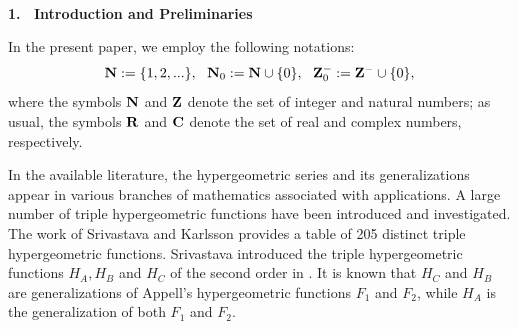 \vspace{0.3cm}

\noindent $\,$\hrulefill $\,$

\vspace{0.2cm}

\begin{center}
{\bf 1. \  Introduction and Preliminaries}
\end{center}
\setcounter{section}{1}
\setcounter{equation}{0}
\renewcommand{\theequation}{\arabic{section}.\arabic{equation}}
In the present paper, we employ the following notations:  
\[{\bf N}:=\{1,2,...\},~~{\bf N}_{0}:={\bf N}\cup\{0\},~~{\bf Z}_{0}^{-}:={\bf Z}^{-}\cup\{0\},\]
where the symbols ${\bf N}$ and ${\bf Z}$ denote the set of integer and natural numbers; 
as usual, the symbols ${\bf R}$ and ${\bf C}$  denote the set of real and complex numbers, respectively.

In the available literature, the hypergeometric series and its generalizations appear in various branches of mathematics associated with applications. A large number of triple hypergeometric functions have been introduced and investigated. The work of Srivastava and Karlsson \cite[Chapter 3]{AB37} provides a table of 205 distinct triple hypergeometric functions. Srivastava  introduced the triple hypergeometric functions $H_{A} , H_{B}$ and $H_{C}$ of the second order in \cite{AB34,AB35}. It is known that $H_{C}$ and $H_{B}$ are generalizations of Appell's hypergeometric functions $F_{1}$ and $F_{2}$, while $H_{A}$ is the generalization of both $F_{1}$ and $F_{2}$.

